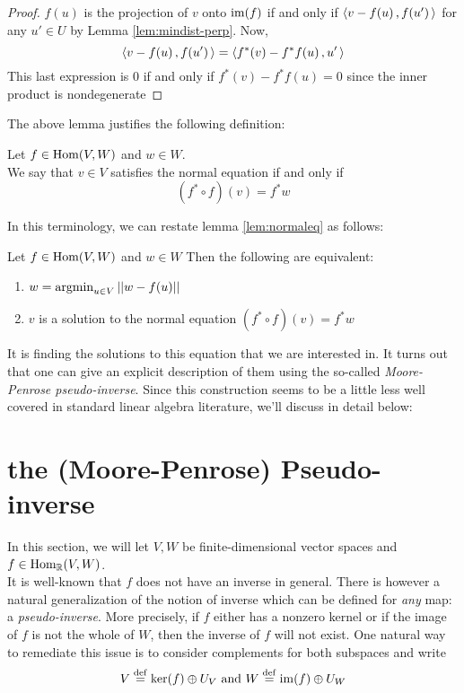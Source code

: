 \begin{proof}
	$f(u)$ is the projection of $v$ onto $\operatorname{im}(f)$ if and only if $\left\langle v-f(u)\,,f(u')\, \right\rangle$ for any $u' \in U$ by Lemma \ref{lem:mindist-perp}. Now,
	\[
	\left\langle v-f(u)\,,f(u')\, \right\rangle=\left\langle f^*(v)-f^*f(u)\,,u'\, \right\rangle
	\]
	This last expression is $0$ if and only if $f^*(v)-f^*f(u)=0$ since the inner product is nondegenerate
\end{proof}

The above lemma justifies the following definition:

\begin{definition}
	Let $f \in \operatorname{Hom}(V,W)$ and $w \in W$.\\ 
	We say that $v \in V$ satisfies the normal equation if and only if 
	\[
	(f^* \circ f)(v) = f^* w
	\]
\end{definition}
In this terminology, we can restate lemma \ref{lem:normaleq} as follows:
\begin{lemma}
	Let $f \in \operatorname{Hom}(V,W)$ and $w \in W$ Then the following are equivalent:
	\begin{enumerate}
		\item $w =\operatorname{argmin}_{u \in V}\vert \vert w-f(u)\vert \vert$
		\item $v$ is a solution to the normal equation $(f^* \circ f)(v) = f^* w$
	\end{enumerate}
\end{lemma}
\noindent It is finding the solutions to this equation that we are interested in. It turns out that one can give an explicit description of them using the so-called \emph{Moore-Penrose pseudo-inverse}. Since this construction seems to be a little less well covered in standard linear algebra literature, we'll discuss in detail below: 
\section{the (Moore-Penrose) Pseudo-inverse}

In this section, we will let $V, W$ be finite-dimensional vector spaces and $f \in \operatorname{Hom}_{\mathbb{R}}(V,W)$.\\ It is well-known that $f$ does not have an inverse in general. There is however a natural generalization of the notion of inverse which can be defined for \emph{any} map: a \emph{pseudo-inverse}. More precisely, if $f$ either has  a nonzero kernel or if the image of $f$ is not the whole of $W$, then the inverse of $f$ will not exist. One natural way to remediate this issue is to consider complements for both subspaces and write 
\[V\stackrel{\operatorname{def}}{=} \ker(f)\oplus U_V \textrm{ and } W\stackrel{\operatorname{def}}{=} \operatorname{im}(f)\oplus U_W\]

